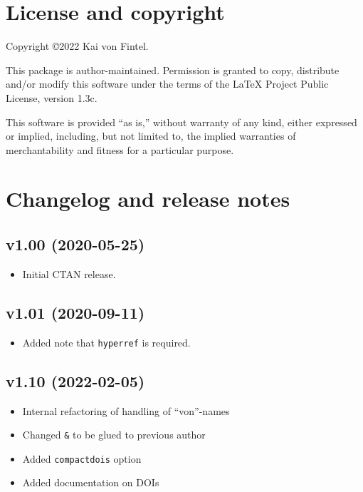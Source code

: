 \documentclass[
]{article}
\providecommand{\tightlist}{%
  \setlength{\itemsep}{0pt}\setlength{\parskip}{0pt}}
\begin{document}
\hypertarget{license-and-copyright}{%
\section{License and copyright}\label{license-and-copyright}}

Copyright ©2022 Kai von Fintel.

This package is author-maintained. Permission is granted to copy,
distribute and/or modify this software under the terms of the LaTeX
Project Public License, version 1.3c.

This software is provided ``as is,'' without warranty of any kind,
either expressed or implied, including, but not limited to, the implied
warranties of merchantability and fitness for a particular purpose.

\hypertarget{changelog-and-release-notes}{%
\section{Changelog and release
notes}\label{changelog-and-release-notes}}

\hypertarget{v1.00-2020-05-25}{%
\subsection*{v1.00 (2020-05-25)}\label{v1.00-2020-05-25}}

\begin{itemize}
\tightlist
\item
  Initial CTAN release.
\end{itemize}

\hypertarget{v1.01-2020-09-11}{%
\subsection*{v1.01 (2020-09-11)}\label{v1.01-2020-09-11}}

\begin{itemize}
\tightlist
\item
  Added note that \texttt{hyperref} is required.
\end{itemize}

\hypertarget{v1.10-2022-02-05}{%
\subsection*{v1.10 (2022-02-05)}\label{v1.10-2022-02-05}}

\begin{itemize}
\tightlist
\item
  Internal refactoring of handling of ``von''-names
\item
  Changed \texttt{\&} to be glued to previous author
\item
  Added \texttt{compactdois} option
\item
  Added documentation on DOIs
\end{itemize}
\end{document}
